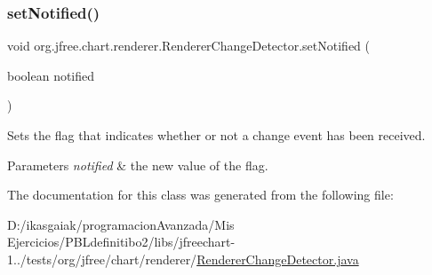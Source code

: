 \subsubsection{\texorpdfstring{set\+Notified()}{setNotified()}}
{\footnotesize\ttfamily void org.\+jfree.\+chart.\+renderer.\+Renderer\+Change\+Detector.\+set\+Notified (\begin{DoxyParamCaption}\item[{boolean}]{notified }\end{DoxyParamCaption})}

Sets the flag that indicates whether or not a change event has been received.


\begin{DoxyParams}{Parameters}
{\em notified} & the new value of the flag. \\
\hline
\end{DoxyParams}


The documentation for this class was generated from the following file\+:\begin{DoxyCompactItemize}
\item 
D\+:/ikasgaiak/programacion\+Avanzada/\+Mis Ejercicios/\+P\+B\+Ldefinitibo2/libs/jfreechart-\/1../tests/org/jfree/chart/renderer/\mbox{\hyperlink{_renderer_change_detector_8java}{Renderer\+Change\+Detector.\+java}}\end{DoxyCompactItemize}
